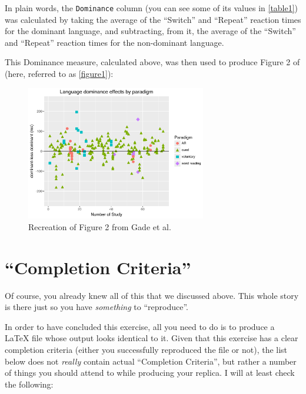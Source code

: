\documentclass[11pt,a4paper]{scrartcl}
\begin{document}
In plain words, the \texttt{Dominance} column (you can see some of its values in \autoref{table1}) was calculated by taking the average of the “Switch” and “Repeat” reaction times for the dominant language, and subtracting, from it, the average of the “Switch” and “Repeat” reaction times for the non-dominant language.


This Dominance measure, calculated above, was then used to produce Figure 2 of \textcite{gade2021} (here, referred to as \autoref{figure1}):

\begin{figure}[h] 
    \centering
    \includegraphics[width=0.7\textwidth]{Figure_2_GadeEtAl.png} 
    \caption{Recreation of Figure 2 from Gade et al.}
    \label{figure1}
    \label{fig:gade}
\end{figure}


\newpage
\section{“Completion Criteria”}
Of course, you already knew all of this that we discussed above. This whole story is
there just so you have \textit{something} to “reproduce”.


In order to have concluded this exercise, all you need to do is to produce a LaTeX
file whose output looks identical to it. Given that this exercise has a clear completion
criteria (either you successfully reproduced the file or not), the list below does not \textit{really}
contain actual “Completion Criteria”, but rather a number of things you should attend
to while producing your replica. I will at least check the following:
\end{document}
